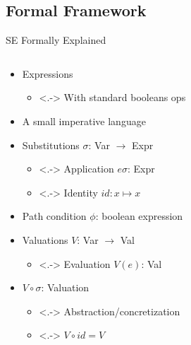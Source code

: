 \documentclass{beamer}
\begin{document}
\subsection{Formal Framework}

\begin{frame}{SE Formally Explained~\parencite{boer2021}}
  \begin{columns}[t]
    \begin{column}{.6\textwidth}
      \begin{itemize}[<+->]
        \item Expressions
              \begin{itemize}
                \item<.-> With standard booleans ops
              \end{itemize}
        \item A small imperative language
        \item Substitutions $\sigma$: Var $\rightarrow$ Expr
              \begin{itemize}
                \item<.-> Application $e\sigma$: Expr
                \item<.-> Identity $id : x \mapsto x$
              \end{itemize}
        \item Path condition $\phi$: boolean expression
        \item Valuations $V$: Var $\rightarrow$ Val
              \begin{itemize}
                \item<.-> Evaluation $V(e)$: Val
              \end{itemize}
        \item $V \circ \sigma$: Valuation
              \begin{itemize}
                \item<.-> Abstraction/concretization
                \item<.-> $V \circ id = V$
              \end{itemize}
      \end{itemize}
    \end{column}


\end{columns}
\end{frame}
\end{document}
